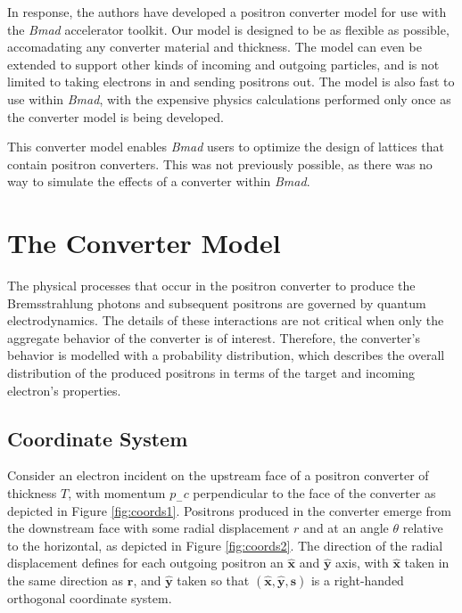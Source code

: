 \documentclass[letter,
               biblatex,     %
               keeplastbox,   %
               ]{jacow}
\newcommand{\bmad}{\textit{Bmad}}
\newcommand{\xx}{\mathbf{\hat{x}}}
\newcommand{\yy}{\mathbf{\hat{y}}}
\newcommand{\rrr}{\mathbf{r}}
\begin{document}
In response, the authors have developed a positron converter model for use with the \bmad{} accelerator toolkit.
Our model is designed to be as flexible as possible, accomadating any converter material and thickness.
The model can even be extended to support other kinds of incoming and outgoing particles, and is not limited to taking electrons in and sending positrons out.
The model is also fast to use within \bmad{}, with the expensive physics calculations performed only once as the converter model is being developed. %

This converter model enables \bmad{} users to optimize the design of lattices that contain positron converters.
This was not previously possible, as there was no way to simulate the effects of a converter within \bmad{}. %


\section{The Converter Model}

The physical processes that occur in the positron converter to produce the Bremsstrahlung photons and subsequent positrons are governed by quantum electrodynamics. %
The details of these interactions are not critical when only the aggregate behavior of the converter is of interest.
Therefore, the converter's behavior is modelled with a probability distribution, which describes the overall distribution of the produced positrons in terms of the target and incoming electron's properties. %

\subsection{Coordinate System}

Consider an electron incident on the upstream face of a positron converter of thickness $T$, with momentum $p_- c$ perpendicular to the face of the converter as depicted in Figure \ref{fig:coords1}.
Positrons produced in the converter emerge from the downstream face with some radial displacement $r$ and at an angle $\theta$ relative to the horizontal, as depicted in Figure \ref{fig:coords2}.
The direction of the radial displacement defines for each outgoing positron an $\xx$ and $\yy$ axis, with $\xx$ taken in the same direction as $\rrr$, and $\yy$ taken so that $(\xx, \yy, \mathbf{s})$ is a right-handed orthogonal coordinate system.
\end{document}
